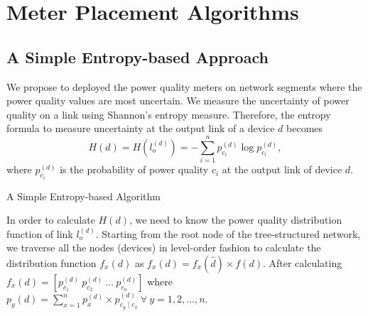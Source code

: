 \section{Meter Placement Algorithms}
\subsection{A Simple Entropy-based Approach}
\label{sec:simpleH}
We propose to deployed the power quality meters on network segments where the power quality values are most uncertain. We measure the uncertainty of power quality on a link using Shannon's entropy measure. Therefore, the entropy formula to measure uncertainty at the output link of a device $d$ becomes
\[H(d) = H(l_{o}^{(d)}) = -\sum_{i=1}^n p_{c_i}^{(d)} \log p_{c_i}^{(d)},\]
where $p_{c_i}^{(d)}$ is the probability of power quality $c_i$ at the output link of device $d$.

\begin{algorithm}[!p]
\vspace{0.2cm}

\vspace{0.2cm}\caption{A Simple Entropy-based Algorithm}\vspace{0.2cm} \label{algo-1}
\end{algorithm}

In order to calculate $H(d)$, we need to know the power quality distribution function of link $l_{o}^{(d)}$. Starting from the root node of the tree-structured network, we traverse all the nodes (devices) in level-order fashion to calculate the distribution function $f_{x}(d)$ as $f_{x}(d) = f_x(\hat d) \times f(d)$. After calculating $f_{x}(d) = [p_{c_1}^{(d)} \ p_{c_2}^{(d)} \ \dots \ p_{c_n}^{(d)}]$ where $p_y(d) = \sum_{x=1}^n p_x^{(d)} \times p_{c_y \mid c_x}^{(d)} \ \forall \ y = 1,2,\dots,n$.

